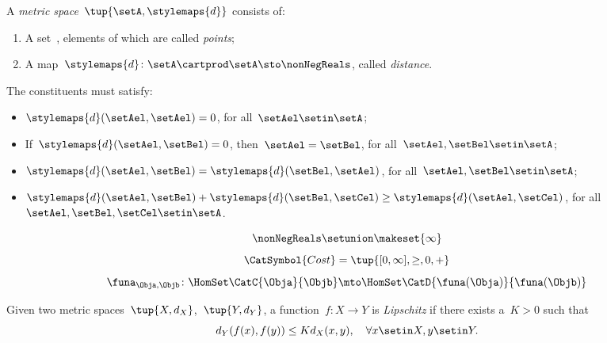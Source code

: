 {\begin{forslides}
    \begin{definition}
        \label{def:metric_space}
        A \emph{metric space}~$\tup{\setA,\stylemaps{d}}$ consists of:
        \begin{enumerate}
            \item A set~\setA, elements of which are called \emph{points};
            \item A map~$\stylemaps{d}\colon \setA\cartprod \setA \sto \nonNegReals$, called \emph{distance}.
        \end{enumerate}
        The constituents must satisfy:
        \begin{itemize}
            \item $\stylemaps{d}(\setAel,\setAel)=0$, for all~$\setAel\setin \setA$;
            \item If~$\stylemaps{d}(\setAel, \setBel)=0$, then~$\setAel=\setBel$, for all~$\setAel,\setBel\setin \setA$;
            \item $\stylemaps{d}(\setAel, \setBel)=\stylemaps{d}(\setBel, \setAel)$, for all~$\setAel,\setBel\setin \setA$;
            \item $\stylemaps{d}(\setAel, \setBel)+\stylemaps{d}(\setBel, \setCel)\geq \stylemaps{d}(\setAel, \setCel)$, for all~$\setAel,\setBel,\setCel\setin \setA$.
        \end{itemize}
    \end{definition}
    \begin{equation}
        \label{eq:r_with_inft}
        \nonNegReals \setunion \makeset{\infty}
    \end{equation}
    \begin{equation}
        \label{eq:cost_cat}
        \CatSymbol{Cost}=\tup{[0,\infty], \geq, 0, +}
    \end{equation}
    \begin{equation}
        \label{eq:enriched_fun_a}
        \funa_{\Obja, \Objb} \colon \HomSet\CatC{\Obja}{\Objb} \mto \HomSet\CatD{\funa(\Obja)}{\funa(\Objb)}
    \end{equation}
    
    \begin{definition}
        \label{def:cost_enrich_a}
        Given two metric spaces~$\tup{X,d_X}$,~$\tup{Y,d_Y}$, a function~$f\colon X\to Y$ is \emph{Lipschitz} if there exists a~$K>0$ such that
        \begin{equation}
            d_Y(f(x),f(y))\leq Kd_X(x,y),\quad \forall x\setin X,y\setin Y.
        \end{equation}
    \end{definition}


\end{forslides}}
